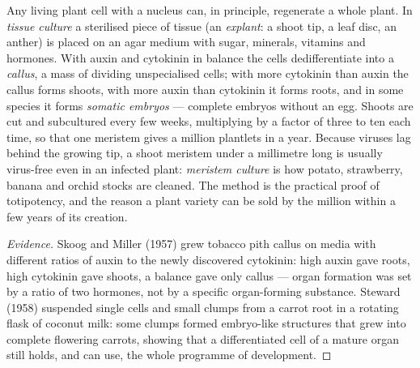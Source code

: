 \begin{proposition}\label{prop:b2:asexual-reproduction:tissueculture}
Any living plant cell with a nucleus can, in principle, regenerate a
whole plant. In \emph{tissue culture} a sterilised piece of tissue
(an \emph{explant}: a shoot tip, a leaf disc, an anther) is placed on
an agar medium with sugar, minerals, vitamins and hormones. With
auxin and cytokinin in balance the cells dedifferentiate into a
\emph{callus}, a mass of dividing unspecialised cells; with more
cytokinin than auxin the callus forms shoots, with more auxin than
cytokinin it forms roots, and in some species it forms \emph{somatic
embryos} --- complete embryos without an egg. Shoots are cut and
subcultured every few weeks, multiplying by a factor of three to
ten each time, so that one meristem gives a million plantlets in a
year. Because viruses lag behind the growing tip, a shoot meristem
under a millimetre long is usually virus-free even in an infected
plant: \emph{meristem culture} is how potato, strawberry, banana and
orchid stocks are cleaned. The method is the practical proof of
totipotency, and the reason a plant variety can be sold by the
million within a few years of its creation.
\end{proposition}
\begin{proof}[Evidence]
Skoog and Miller (1957) grew tobacco pith callus on media with
different ratios of auxin to the newly discovered cytokinin: high
auxin gave roots, high cytokinin gave shoots, a balance gave only
callus --- organ formation was set by a ratio of two hormones, not
by a specific organ-forming substance. Steward (1958) suspended
single cells and small clumps from a carrot root in a rotating
flask of coconut milk: some clumps formed embryo-like structures
that grew into complete flowering carrots, showing that a
differentiated cell of a mature organ still holds, and can use, the
whole programme of development.
\end{proof}

